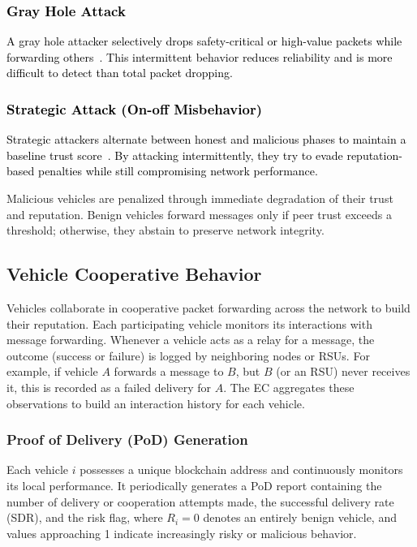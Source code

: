 \cite{cho2010survey}\documentclass[journal,comsoc,twoside]{IEEEtran}
\begin{document}
\textcolor{black}{
\subsubsection{Gray Hole Attack} 
A gray hole attacker selectively drops safety-critical or high-value packets while forwarding others~\cite{khodjamov}. This intermittent behavior reduces reliability and is more difficult to detect than total packet dropping. }
\textcolor{black}{
\subsubsection{Strategic Attack (On-off Misbehavior)}
Strategic attackers alternate between honest and malicious phases to maintain a baseline trust score~\cite{razafimanjato}. By attacking intermittently, they try to evade reputation-based penalties while still compromising network performance.}

Malicious vehicles are penalized through immediate degradation of their trust and reputation. Benign vehicles forward messages only if peer trust exceeds a threshold; otherwise, they abstain to preserve network integrity.

\subsection{Vehicle Cooperative Behavior}
Vehicles collaborate in cooperative packet forwarding across the network to build their reputation. Each participating vehicle monitors its interactions with message forwarding. Whenever a vehicle acts as a relay for a message, the outcome (success or failure) is logged by neighboring nodes or RSUs. For example, if vehicle $A$ forwards a message to $B$, but $B$ (or an RSU) never receives it, this is recorded as a failed delivery for $A$. The EC aggregates these observations to build an interaction history for each vehicle.

\subsubsection{Proof of Delivery (PoD) Generation}
Each vehicle $i$ possesses a unique blockchain address and continuously monitors its local performance. It periodically generates a PoD report containing the number of delivery or cooperation attempts made, the successful delivery rate (SDR), and the risk flag, where $R_i = 0$ denotes an entirely benign vehicle, and values approaching 1 indicate increasingly risky or malicious behavior.
\end{document}
